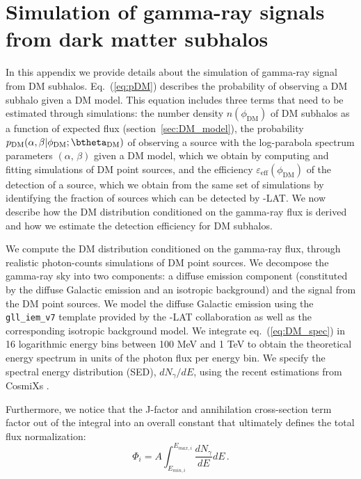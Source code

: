 \section{Simulation of gamma-ray signals from dark matter subhalos}
\label{app:sim-ps}

In this appendix we provide details about the simulation of gamma-ray signal from DM subhalos.
Eq.~(\ref{eq:pDM}) describes the probability of observing a DM subhalo 
given a DM model.
This equation includes three terms that need to be estimated through simulations: 
the number density $n(\phi_\textrm{DM})$ of DM subhalos as a function of expected flux (section~\ref{sec:DM_model}), the probability $p_\textrm{DM}(\alpha,\beta|\phi_\textrm{DM};\btheta_\textrm{DM})$  of observing a source with the log-parabola spectrum parameters $(\alpha,\,\beta)$ given a DM model, which we obtain by computing and fitting simulations of DM point sources, and the efficiency $\varepsilon_\textrm{eff}(\phi_\textrm{DM})$ of the detection of a source, which we obtain from the same set of simulations by identifying the fraction of sources which can be detected by \Fermi-LAT.  
We now describe how the DM distribution conditioned on the gamma-ray flux is derived and how we estimate the detection efficiency for DM subhalos.

We compute the DM distribution  conditioned on the gamma-ray flux, through realistic photon-counts simulations of DM point sources. 
We decompose the gamma-ray sky into two  components: a diffuse emission component (constituted by the diffuse Galactic emission and an isotropic background) and the signal from the DM point sources. 
We model the diffuse Galactic emission using the \verb|gll_iem_v7| template provided by the \Fermi-LAT collaboration as well as the corresponding isotropic background model.
We integrate eq.~(\ref{eq:DM_spec}) in 16 logarithmic energy bins between 100 MeV and 1 TeV to obtain the theoretical energy spectrum in units of the photon flux per energy bin.
We specify the spectral energy distribution (SED), $dN_\gamma/dE$, using the recent estimations from CosmiXs \cite{2024JCAP...03..035A}.

Furthermore, we notice that the J-factor and annihilation cross-section term factor out of the integral into an overall constant that ultimately defines the total flux normalization: 
\begin{equation}
   \Phi_i = A \int_{E_{min, i}}^{E_{max,i} }\frac{dN_\gamma}{dE}dE \,.
\end{equation}

